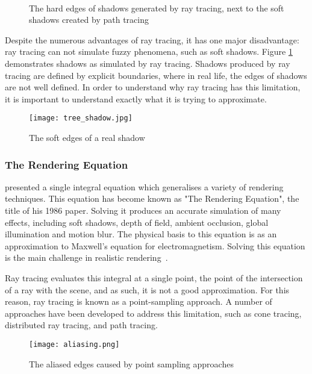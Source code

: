 \begin{figure}
\centering
	\centering
	~

	\caption{The hard edges of shadows generated by ray tracing, next to the soft shadows created by path tracing}
	\label{fig:shadow-hard-edge}
\end{figure}

Despite the numerous advantages of ray tracing, it has one major disadvantage: ray tracing can not simulate fuzzy phenomena, such as soft shadows. Figure \ref{fig:shadow-hard-edge} demonstrates shadows as simulated by ray tracing. Shadows produced by ray tracing are defined by explicit boundaries, where in real life, the edges of shadows are not well defined. In order to understand why ray tracing has this limitation, it is important to understand exactly what it is trying to approximate.

\begin{figure}
\centering
	\texttt{[image: tree\_shadow.jpg]}
	\caption{The soft edges of a real shadow}
	\label{fig:shadow-soft-edge}
\end{figure}

\subsubsection{The Rendering Equation}
\cite{kajiya86therendering} presented a single integral equation which generalises a variety of rendering techniques. This equation has become known as "The Rendering Equation", the title of his 1986 paper. Solving it produces an accurate simulation of many effects, including soft shadows, depth of field, ambient occlusion, global illumination and motion blur. The physical basis to this equation is as an approximation to Maxwell's equation for electromagnetism. Solving this equation is the main challenge in realistic rendering~\parencite{dimov07numericalmethods}.

Ray tracing evaluates this integral at a single point, the point of the intersection of a ray with the scene, and as such, it is not a good approximation. For this reason, ray tracing is known as a point-sampling approach. A number of approaches have been developed to address this limitation, such as cone tracing, distributed ray tracing, and path tracing.

\begin{figure}
\centering
	\texttt{[image: aliasing.png]}
	\caption{The aliased edges caused by point sampling approaches}
	\label{fig:ray-tracing-aliases}
\end{figure}

